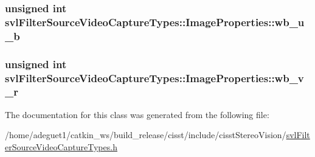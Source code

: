 \hypertarget{classsvl_filter_source_video_capture_types_1_1_image_properties_a3f11dd2be120711075498c0711d77251}{
\subsubsection[{wb\-\_\-u\-\_\-b}]{\setlength{\rightskip}{0pt plus 5cm}unsigned int svl\-Filter\-Source\-Video\-Capture\-Types\-::\-Image\-Properties\-::wb\-\_\-u\-\_\-b}}\label{classsvl_filter_source_video_capture_types_1_1_image_properties_a3f11dd2be120711075498c0711d77251}
\hypertarget{classsvl_filter_source_video_capture_types_1_1_image_properties_a45583b41d5248ffc131b3982e14bab34}{
\subsubsection[{wb\-\_\-v\-\_\-r}]{\setlength{\rightskip}{0pt plus 5cm}unsigned int svl\-Filter\-Source\-Video\-Capture\-Types\-::\-Image\-Properties\-::wb\-\_\-v\-\_\-r}}\label{classsvl_filter_source_video_capture_types_1_1_image_properties_a45583b41d5248ffc131b3982e14bab34}


The documentation for this class was generated from the following file\-:\begin{DoxyCompactItemize}
\item 
/home/adeguet1/catkin\-\_\-ws/build\-\_\-release/cisst/include/cisst\-Stereo\-Vision/\hyperlink{svl_filter_source_video_capture_types_8h}{svl\-Filter\-Source\-Video\-Capture\-Types.\-h}\end{DoxyCompactItemize}
